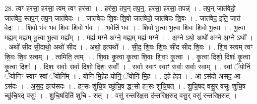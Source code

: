 \documentclass[17pt]{extarticle}
\begin{document}
28. त्वꣳ हर॑सा॒ हर॑सा॒ त्वम् त्वꣳ हर॑सा । . हर॑सा॒ तप॒न् तप॒न्॒. हर॑सा॒ हर॑सा॒ तपन्न्॑ । . तप॒न् जात॑वेदो॒ जात॑वेद॒ स्तप॒न् तप॒न् जात॑वेदः । . जात॑वेदः शि॒वः शि॒वो जात॑वेदो॒ जात॑वेदः शि॒वः । . जात॑वेद॒ इति॒ जात॑ - वे॒दः॒ । . शि॒वो भ॑व भव शि॒वः शि॒वो भ॑व । . भ॒वेति॑ भव । . शि॒वो भू॒त्वा भू॒त्वा शि॒वः शि॒वो भू॒त्वा । . भू॒त्वा मह्य॒म् मह्य॑म् भू॒त्वा भू॒त्वा मह्य᳚म् । . मह्य॑ मग्ने अग्ने॒ मह्य॒म् मह्य॑ मग्ने । . अ॒ग्ने ऽथो॒ अथो॑ अग्ने अ॒ग्ने ऽथो᳚ । . अथो॑ सीद सी॒दाथो॒ अथो॑ सीद । . अथो॒ इत्यथो᳚ । . सी॒द॒ शि॒वः शि॒वः सी॑द सीद शि॒वः । . शि॒व स्त्वम् त्वꣳ शि॒वः शि॒व स्त्वम् । . त्वमिति॒ त्वम् । . शि॒वाः कृ॒त्वा कृ॒त्वा शि॒वाः शि॒वाः कृ॒त्वा । . कृ॒त्वा दिशो॒ दिशः॑ कृ॒त्वा कृ॒त्वा दिशः॑ । . दिशः॒ सर्वाः॒ सर्वा॒ दिशो॒ दिशः॒ सर्वाः᳚ । . सर्वाः॒ स्वाꣳ स्वाꣳ सर्वाः॒ सर्वाः॒ स्वाम् । . स्वां ॅयोनिं॒ ॅयोनिꣳ॒॒ स्वाꣳ स्वां ॅयोनि᳚म् । . योनि॑ मि॒हेह योनिं॒ ॅयोनि॑ मि॒ह । . इ॒हे हेहा । . आ ऽस॑दो असद॒ आ ऽस॑दः । . अ॒स॒द॒ इत्य॑सदः । . हꣳ॒॒सः शु॑चि॒ष च्छु॑चि॒ष द्धꣳ॒॒सो हꣳ॒॒सः शु॑चि॒षत् । . शु॒चि॒षद् वसु॒र् वसुः॑ शुचि॒ष च्छु॑चि॒षद् वसुः॑ । . शु॒चि॒षदिति॑ शुचि - सत् । . वसु॑ रन्तरिक्ष॒स द॑न्तरिक्ष॒सद् वसु॒र् वसु॑ रन्तरिक्ष॒सत् । \newline
\end{document}

